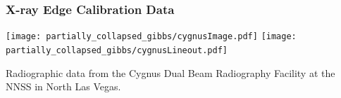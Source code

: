 \documentclass[]{beamer}
\begin{document}


\begin{frame}
  \frametitle{X-ray Edge Calibration Data}
  \texttt{[image: partially\_collapsed\_gibbs/cygnusImage.pdf]}
  \texttt{[image: partially\_collapsed\_gibbs/cygnusLineout.pdf]}

  {\small Radiographic data from the Cygnus Dual Beam Radiography Facility at the NNSS in North Las Vegas.}
\end{frame}
\end{document}
